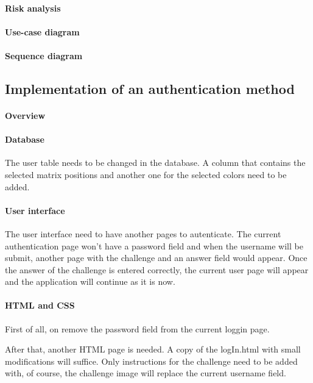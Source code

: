 \documentclass[11pt,a4paper]{article}
\begin{document}
\paragraph{Risk analysis}

\paragraph{Use-case diagram}

\paragraph{Sequence diagram}

\subsection*{Implementation of an authentication method}
\paragraph{Overview}

\paragraph{Database}
The user table needs to be changed in the database. A column that contains the selected matrix positions and another
one for the selected colors need to be added.

\paragraph{User interface}
The user interface need to have another pages to autenticate. The current authentication page won't have a password
field and when the username will be submit, another page with the challenge and an answer field would appear. Once the
answer of the challenge is entered correctly, the current user page will appear and the application will continue as it
is now.

\paragraph{HTML and CSS}
First of all, on remove the password field from the current loggin page.

After that, another HTML page is needed. A copy of the logIn.html with small modifications will suffice. Only
instructions for the challenge need to be added with, of course, the challenge image will replace the current username
field.
\end{document}
